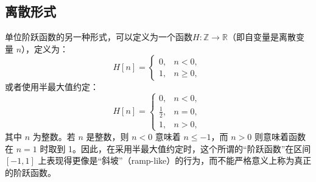 \subsection{离散形式}
单位阶跃函数的另一种形式，可以定义为一个函数$H : \mathbb{Z} \to \mathbb{R}$（即自变量是离散变量 $n$），定义为：
$$
H[n] =
\begin{cases}
0, & n < 0, \\[6pt]
1, & n \geq 0,
\end{cases}~
$$
或者使用半最大值约定：
$$
H[n] =
\begin{cases}
0, & n < 0, \\[6pt]
\tfrac{1}{2}, & n = 0, \\[6pt]
1, & n > 0,
\end{cases}~
$$
其中 $n$ 为整数。若 $n$ 是整数，则 $n < 0$ 意味着 $n \leq -1$，而 $n > 0$ 则意味着函数在 $n = 1$ 时取到 1。因此，在采用半最大值约定时，这个所谓的“阶跃函数”在区间 $[-1,1]$ 上表现得更像是“斜坡”（ramp-like）的行为，而不能严格意义上称为真正的阶跃函数。
